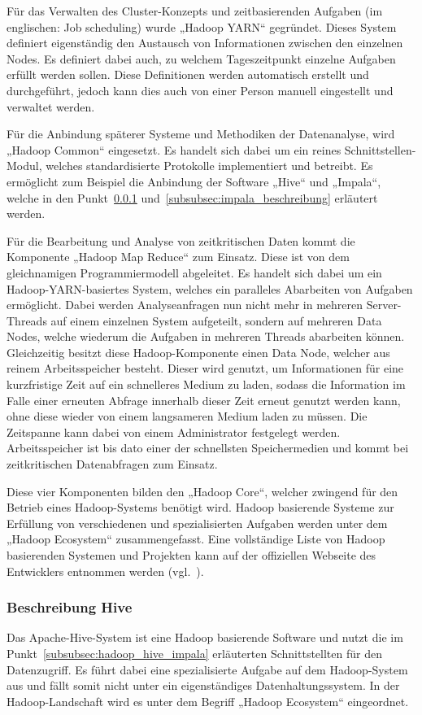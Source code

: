 Für das Verwalten des Cluster-Konzepts und zeitbasierenden Aufgaben (im
englischen: Job scheduling) wurde „Hadoop YARN“ gegründet. Dieses System
definiert eigenständig den Austausch von Informationen zwischen den einzelnen
Nodes. Es definiert dabei auch, zu welchem Tageszeitpunkt einzelne Aufgaben
erfüllt werden sollen. Diese Definitionen werden automatisch erstellt und
durchgeführt, jedoch kann dies auch von einer Person manuell eingestellt und
verwaltet werden.

Für die Anbindung späterer Systeme und Methodiken der Datenanalyse, wird
„Hadoop Common“ eingesetzt. Es handelt sich dabei um ein reines
Schnittstellen-Modul, welches standardisierte Protokolle implementiert und
betreibt. Es ermöglicht zum Beispiel die Anbindung der Software „Hive“ und
„Impala“, welche in den Punkt~\ref{subsubsec:hadoop_beschreibung}
und~\ref{subsubsec:impala_beschreibung} erläutert werden.

Für die Bearbeitung und Analyse von zeitkritischen Daten kommt die Komponente
„Hadoop Map Reduce“ zum Einsatz. Diese ist von dem gleichnamigen
Programmiermodell abgeleitet. Es handelt sich dabei um ein
Hadoop-YARN-basiertes System, welches ein paralleles Abarbeiten von Aufgaben
ermöglicht.  Dabei werden Analyseanfragen nun nicht mehr in mehreren
Server-Threads auf einem einzelnen System aufgeteilt, sondern auf mehreren Data
Nodes, welche wiederum die Aufgaben in mehreren Threads abarbeiten können.
Gleichzeitig besitzt diese Hadoop-Komponente einen Data Node, welcher aus
reinem Arbeitsspeicher besteht. Dieser wird genutzt, um Informationen für eine
kurzfristige Zeit auf ein schnelleres Medium zu laden, sodass die Information
im Falle einer erneuten Abfrage innerhalb dieser Zeit erneut genutzt werden
kann, ohne diese wieder von einem langsameren Medium laden zu müssen. Die
Zeitspanne kann dabei von einem Administrator festgelegt werden.
Arbeitsspeicher ist bis dato einer der schnellsten Speichermedien und kommt bei
zeitkritischen Datenabfragen zum Einsatz.

Diese vier Komponenten bilden den „Hadoop Core“, welcher zwingend für den
Betrieb eines Hadoop-Systems benötigt wird. Hadoop basierende Systeme zur
Erfüllung von verschiedenen und spezialisierten Aufgaben werden unter dem
„Hadoop Ecosystem“ zusammengefasst. Eine vollständige Liste von
Hadoop basierenden Systemen und Projekten kann auf der offiziellen Webseite des
Entwicklers entnommen werden (vgl.~\cite{Hadoop_related_projects}).
\nl%

\subsubsection{Beschreibung Hive}
\label{subsubsec:hadoop_beschreibung}
Das Apache-Hive-System ist eine Hadoop basierende Software und nutzt die im
Punkt~\ref{subsubsec:hadoop_hive_impala} erläuterten Schnittstellten für den
Datenzugriff. Es führt dabei eine spezialisierte Aufgabe auf dem Hadoop-System
aus und fällt somit nicht unter ein eigenständiges Datenhaltungssystem. In der
Hadoop-Landschaft wird es unter dem Begriff „Hadoop Ecosystem“ eingeordnet.

